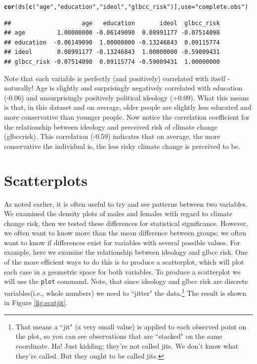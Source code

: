\documentclass[11pt,openany]{book}\usepackage[]{graphicx}\usepackage[]{color}
\makeatletter
\newcommand{\hlstr}[1]{\textcolor[rgb]{0.192,0.494,0.8}{#1}}%
\newcommand{\hlstd}[1]{\textcolor[rgb]{0.345,0.345,0.345}{#1}}%
\newcommand{\hlkwc}[1]{\textcolor[rgb]{0.333,0.667,0.333}{#1}}%
\newcommand{\hlkwd}[1]{\textcolor[rgb]{0.737,0.353,0.396}{\textbf{#1}}}%
\newenvironment{kframe}{%
 \def\at@end@of@kframe{}%
 \ifinner\ifhmode%
  \def\at@end@of@kframe{\end{minipage}}%
  \begin{minipage}{\columnwidth}%
 \fi\fi%
 \def\FrameCommand##1{\hskip\@totalleftmargin \hskip-\fboxsep
 \colorbox{shadecolor}{##1}\hskip-\fboxsep
     \hskip-\linewidth \hskip-\@totalleftmargin \hskip\columnwidth}%
 \MakeFramed {\advance\hsize-\width
   \@totalleftmargin\z@ \linewidth\hsize
   \@setminipage}}%
 {\par\unskip\endMakeFramed%
 \at@end@of@kframe}
\newenvironment{knitrout}{}{} %
\renewenvironment{knitrout}{\begin{singlespace}}{\end{singlespace}}
\makeatother
\begin{document}
\begin{knitrout}
\color{fgcolor}\begin{kframe}
\begin{alltt}
\hlkwd{cor}\hlstd{(ds[}\hlkwd{c}\hlstd{(}\hlstr{"age"}\hlstd{,} \hlstr{"education"}\hlstd{,} \hlstr{"ideol"}\hlstd{,} \hlstr{"glbcc_risk"}\hlstd{)],} \hlkwc{use} \hlstd{=} \hlstr{"complete.obs"}\hlstd{)}
\end{alltt}
\begin{verbatim}
##                    age   education       ideol  glbcc_risk
## age         1.00000000 -0.06149090  0.08991177 -0.07514098
## education  -0.06149090  1.00000000 -0.13246843  0.09115774
## ideol       0.08991177 -0.13246843  1.00000000 -0.59009431
## glbcc_risk -0.07514098  0.09115774 -0.59009431  1.00000000
\end{verbatim}
\end{kframe}
\end{knitrout}

Note that each variable is perfectly (and positively) correlated with itself - naturally! Age is slightly and surprisingly negatively correlated with education (-0.06) and unsurprisingly positively political ideology (+0.09). What this means is that, in this dataset and on average, older people are slightly less educated and more conservative than younger people. Now notice the correlation coefficient for the relationship between ideology and perceived risk of climate change (glbccrisk). This correlation (-0.59) indicates that on average, the more conservative the individual is, the less risky climate change is perceived to be.



\section{Scatterplots}

As noted earlier, it is often useful to try and see patterns between two variables. We examined the density plots of males and females with regard to climate change risk, then we tested these differences for statistical significance. However, we often want to know more than the mean difference between groups; we often want to know if differences exist for variables with several possible values. For example, here we examine the relationship between ideology and glbcc risk. One of the more efficient ways to do this is to produce a scatterplot, which will plot each case in a geometric space for both variables. To produce a scatterplot we will use the \texttt{plot} command. Note, that since ideology and glbcc risk are discrete variables(i.e., whole numbers) we need to ``jitter" the data.\footnote{That means a ``jit" (a very small value) is applied to each observed point on the plot, so
you can see observations that are ``stacked" on the same coordinate. Ha! Just kidding; they're not called jits. We don't know what they're called. But they ought to be called jits.} The result is shown in Figure \ref{fig:scatjit}.  
\end{document}
